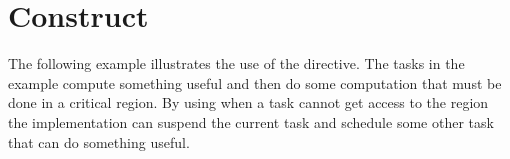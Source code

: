 \pagebreak
\section{ Construct}
\label{sec:taskyield}

The following example illustrates the use of the   directive. 
The tasks in the example compute something useful and then do some computation 
that must be done in a critical region. By using  when a task 
cannot get access to the  region the implementation can suspend 
the current task and schedule some other task that can do something useful. 



